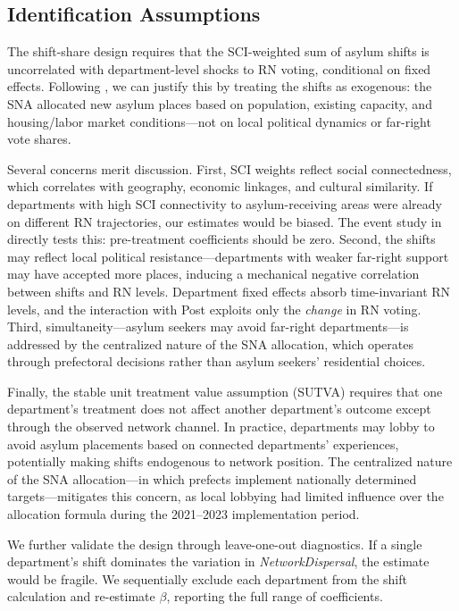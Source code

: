 \documentclass[12pt]{article}
\begin{document}
\subsection{Identification Assumptions}

The shift-share design requires that the SCI-weighted sum of asylum shifts is uncorrelated with department-level shocks to RN voting, conditional on fixed effects. Following \citet{borusyak2022quasi}, we can justify this by treating the shifts as exogenous: the SNA allocated new asylum places based on population, existing capacity, and housing/labor market conditions---not on local political dynamics or far-right vote shares.

Several concerns merit discussion. First, SCI weights reflect social connectedness, which correlates with geography, economic linkages, and cultural similarity. If departments with high SCI connectivity to asylum-receiving areas were already on different RN trajectories, our estimates would be biased. The event study in  directly tests this: pre-treatment coefficients should be zero. Second, the shifts may reflect local political resistance---departments with weaker far-right support may have accepted more places, inducing a mechanical negative correlation between shifts and RN levels. Department fixed effects absorb time-invariant RN levels, and the interaction with Post exploits only the \textit{change} in RN voting. Third, simultaneity---asylum seekers may avoid far-right departments---is addressed by the centralized nature of the SNA allocation, which operates through prefectoral decisions rather than asylum seekers' residential choices.

Finally, the stable unit treatment value assumption (SUTVA) requires that one department's treatment does not affect another department's outcome except through the observed network channel. In practice, departments may lobby to avoid asylum placements based on connected departments' experiences, potentially making shifts endogenous to network position. The centralized nature of the SNA allocation---in which prefects implement nationally determined targets---mitigates this concern, as local lobbying had limited influence over the allocation formula during the 2021--2023 implementation period.

We further validate the design through leave-one-out diagnostics. If a single department's shift dominates the variation in \textit{NetworkDispersal}, the estimate would be fragile. We sequentially exclude each department from the shift calculation and re-estimate $\beta$, reporting the full range of coefficients.
\end{document}
